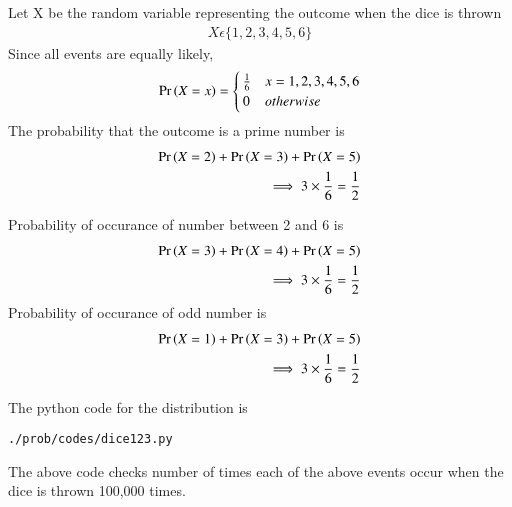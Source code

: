 Let X be the random variable representing the outcome when the dice is thrown
\begin{align}
X \epsilon \{1,2,3,4,5,6\}
\end{align}
Since all events are equally likely,
\begin{align}
\Pr\left(X=x\right)=\begin{cases}
	\frac{1}{6}& x=1,2,3,4,5,6\\
	0 & otherwise
	\end{cases}
\end{align}
The probability that the outcome is a prime number is 
\begin{align}
\Pr\left(X=2\right)+\Pr\left(X=3\right)+\Pr\left(X=5\right) \\
\implies 3 \times \frac{1}{6}=\frac{1}{2}
\end{align}

Probability of occurance of number between 2 and 6 is
\begin{align}
\Pr\left(X=3\right)+\Pr\left(X=4\right)+\Pr\left(X=5\right)
 \\
\implies 3 \times \frac{1}{6}=\frac{1}{2}
\end{align}
Probability of occurance of odd number is
\begin{align}
\Pr\left(X=1\right)+\Pr\left(X=3\right)+\Pr\left(X=5\right)
 \\
\implies 3 \times \frac{1}{6}=\frac{1}{2}
\end{align}

The python code for the distribution is
\begin{lstlisting}
./prob/codes/dice123.py
\end{lstlisting}
The above code checks number of times each of the above events occur when the dice is thrown 100,000 times.
